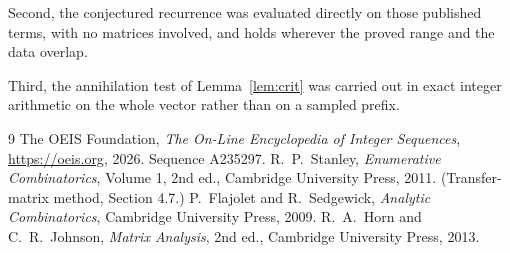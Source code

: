 \documentclass[11pt,a4paper]{article}
\theoremstyle{plain}
\theoremstyle{definition}
\begin{document}
Second, the conjectured recurrence was evaluated directly on those published terms, with no
matrices involved, and holds wherever the proved range and the data overlap.

Third, the annihilation test of Lemma~\ref{lem:crit} was carried out in exact integer
arithmetic on the whole vector rather than on a sampled prefix.

\begin{thebibliography}{9}
 The OEIS Foundation, \emph{The On-Line Encyclopedia of Integer
Sequences}, \url{https://oeis.org}, 2026. Sequence A235297.
 R.~P.~Stanley, \emph{Enumerative Combinatorics}, Volume 1, 2nd ed.,
Cambridge University Press, 2011. (Transfer-matrix method, Section 4.7.)
 P.~Flajolet and R.~Sedgewick, \emph{Analytic Combinatorics}, Cambridge
University Press, 2009.
 R.~A.~Horn and C.~R.~Johnson, \emph{Matrix Analysis}, 2nd ed., Cambridge
University Press, 2013.
\end{thebibliography}
\end{document}

